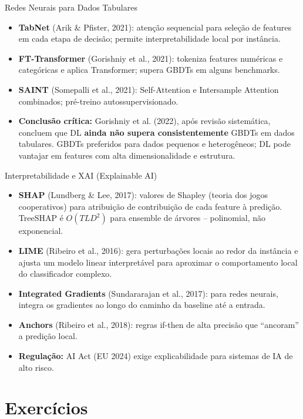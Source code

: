 \documentclass[12pt,a4paper]{article}
\begin{document}
\begin{estadoartebox}{Redes Neurais para Dados Tabulares}
\begin{itemize}
  \item \textbf{TabNet} (Arik \& Pfister, 2021): atenção sequencial para seleção de features em cada etapa de decisão; permite interpretabilidade local por instância.
  \item \textbf{FT-Transformer} (Gorishniy et al., 2021): tokeniza features numéricas e categóricas e aplica Transformer; supera GBDTs em alguns benchmarks.
  \item \textbf{SAINT} (Somepalli et al., 2021): Self-Attention e Intersample Attention combinados; pré-treino autossupervisionado.
  \item \textbf{Conclusão crítica:} Gorishniy et al. (2022), após revisão sistemática, concluem que DL \textbf{ainda não supera consistentemente} GBDTs em dados tabulares. GBDTs preferidos para dados pequenos e heterogêneos; DL pode vantajar em features com alta dimensionalidade e estrutura.
\end{itemize}
\end{estadoartebox}

\begin{estadoartebox}{Interpretabilidade e XAI (Explainable AI)}
\begin{itemize}
  \item \textbf{SHAP} (Lundberg \& Lee, 2017): valores de Shapley (teoria dos jogos cooperativos) para atribuição de contribuição de cada feature à predição. TreeSHAP é $O(TLD^2)$ para ensemble de árvores -- polinomial, não exponencial.
  \item \textbf{LIME} (Ribeiro et al., 2016): gera perturbações locais ao redor da instância e ajusta um modelo linear interpretável para aproximar o comportamento local do classificador complexo.
  \item \textbf{Integrated Gradients} (Sundararajan et al., 2017): para redes neurais, integra os gradientes ao longo do caminho da baseline até a entrada.
  \item \textbf{Anchors} (Ribeiro et al., 2018): regras if-then de alta precisão que ``ancoram'' a predição local.
  \item \textbf{Regulação:} AI Act (EU 2024) exige explicabilidade para sistemas de IA de alto risco.
\end{itemize}
\end{estadoartebox}

\section{Exercícios}
\end{document}
